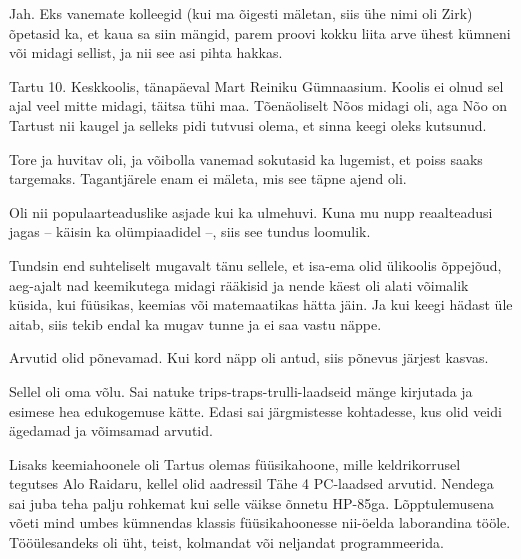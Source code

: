 
Jah. Eks vanemate kolleegid (kui ma õigesti mäletan, siis ühe
nimi oli Zirk) õpetasid ka, et kaua sa siin mängid, parem proovi kokku liita arve 
ühest kümneni või midagi sellist, ja nii see asi pihta hakkas.


Tartu 10. Keskkoolis, tänapäeval Mart 
Reiniku Gümnaasium. Koolis ei olnud sel ajal veel mitte midagi, täitsa tühi maa. 
Tõenäoliselt Nõos midagi oli, aga Nõo on Tartust nii kaugel ja 
selleks pidi tutvusi olema, et sinna keegi oleks kutsunud.


Tore ja huvitav oli, ja võibolla vanemad sokutasid ka lugemist, et 
poiss saaks targemaks. Tagantjärele enam ei mäleta, mis see täpne ajend oli.


Oli nii populaarteaduslike asjade kui ka ulmehuvi. Kuna mu nupp 
reaalteadusi jagas -- käisin ka olümpiaadidel --, siis see 
tundus loomulik. 


Tundsin end suhteliselt mugavalt tänu sellele, et isa-ema olid ülikoolis õppejõud, 
aeg-ajalt nad keemikutega midagi rääkisid ja nende käest oli alati 
võimalik küsida, kui füüsikas, keemias või matemaatikas hätta jäin. 
Ja kui keegi hädast üle aitab, siis tekib endal ka mugav 
tunne ja ei saa vastu näppe.


Arvutid olid põnevamad. Kui kord näpp oli antud, siis põnevus järjest kasvas.


Sellel oli oma võlu. Sai natuke trips-traps-trulli-laadseid 
mänge kirjutada ja esimese hea edukogemuse kätte. Edasi sai 
järgmistesse kohtadesse, kus olid veidi ägedamad ja võimsamad arvutid.

Lisaks keemiahoonele oli Tartus olemas 
füüsikahoone, mille keldrikorrusel tegutses 
Alo Raidaru, kellel olid aadressil Tähe 4 PC-laadsed arvutid. Nendega sai juba teha palju rohkemat kui selle väikse 
õnnetu HP-85ga. Lõpptulemusena võeti mind umbes 
kümnendas klassis füüsikahoonesse nii-öelda laborandina tööle. 
Tööülesandeks oli üht, teist, kolmandat või neljandat programmeerida. 

